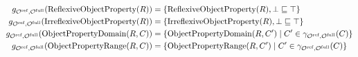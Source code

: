 \begin{definition}
\begin{widepage}
\begin{align*}
      g_{\Omcref,\Omcfull}(\op{ReflexiveObjectProperty}(R)) ={} & \{ \op{ReflexiveObjectProperty}(R), \bot \sqsubseteq \top \} \\
      g_{\Omcref,\Omcfull}(\op{IrreflexiveObjectProperty}(R)) ={} & \{ \op{IrreflexiveObjectProperty}(R), \bot \sqsubseteq \top \} \\
      g_{\Omcref,\Omcfull}(\op{ObjectPropertyDomain}(R, C)) ={} & \{\op{ObjectPropertyDomain}(R, C') \mid C' \in \gamma_{\Omcref,\Omcfull} (C)\} \\
      g_{\Omcref,\Omcfull}(\op{ObjectPropertyRange}(R, C)) ={} & \{\op{ObjectPropertyRange}(R, C') \mid C' \in \gamma_{\Omcref,\Omcfull} (C)\}
    \end{align*}
  \end{widepage}
\end{definition}
